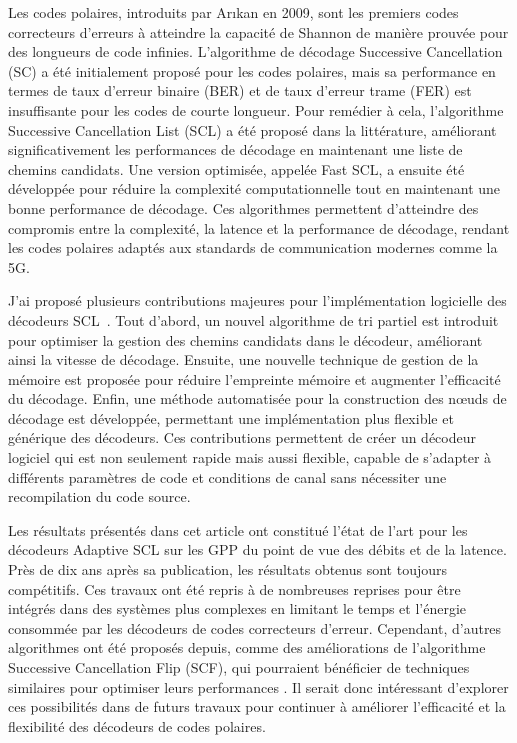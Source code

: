 \documentclass[11pt]{report}
\begin{document}
Les codes polaires, introduits par Arıkan en 2009, sont les premiers codes correcteurs d'erreurs à atteindre la capacité de Shannon de manière prouvée pour des longueurs de code infinies. L'algorithme de décodage Successive Cancellation (SC) a été initialement proposé pour les codes polaires, mais sa performance en termes de taux d'erreur binaire (BER) et de taux d'erreur trame (FER) est insuffisante pour les codes de courte longueur. Pour remédier à cela, l'algorithme Successive Cancellation List (SCL) a été proposé dans la littérature, améliorant significativement les performances de décodage en maintenant une liste de chemins candidats. Une version optimisée, appelée Fast SCL, a ensuite été développée pour réduire la complexité computationnelle tout en maintenant une bonne performance de décodage. Ces algorithmes permettent d'atteindre des compromis entre la complexité, la latence et la performance de décodage, rendant les codes polaires adaptés aux standards de communication modernes comme la 5G.

J'ai proposé plusieurs contributions majeures pour l'implémentation logicielle des décodeurs SCL~\cite{leonardon:hal-01987848}. Tout d'abord, un nouvel algorithme de tri partiel est introduit pour optimiser la gestion des chemins candidats dans le décodeur, améliorant ainsi la vitesse de décodage. Ensuite, une nouvelle technique de gestion de la mémoire est proposée pour réduire l'empreinte mémoire et augmenter l'efficacité du décodage. Enfin, une méthode automatisée pour la construction des nœuds de décodage est développée, permettant une implémentation plus flexible et générique des décodeurs. Ces contributions permettent de créer un décodeur logiciel qui est non seulement rapide mais aussi flexible, capable de s'adapter à différents paramètres de code et conditions de canal sans nécessiter une recompilation du code source.

Les résultats présentés dans cet article ont constitué l'état de l'art pour les décodeurs Adaptive SCL sur les GPP du point de vue des débits et de la latence. Près de dix ans après sa publication, les résultats obtenus sont toujours compétitifs. Ces travaux ont été repris à de nombreuses reprises pour être intégrés dans des systèmes plus complexes en limitant le temps et l'énergie consommée par les décodeurs de codes correcteurs d'erreur. Cependant, d'autres algorithmes ont été proposés depuis, comme des améliorations de l'algorithme Successive Cancellation Flip (SCF), qui pourraient bénéficier de techniques similaires pour optimiser leurs performances \cite{Sagitov2025}. Il serait donc intéressant d'explorer ces possibilités dans de futurs travaux pour continuer à améliorer l'efficacité et la flexibilité des décodeurs de codes polaires.
\end{document}
